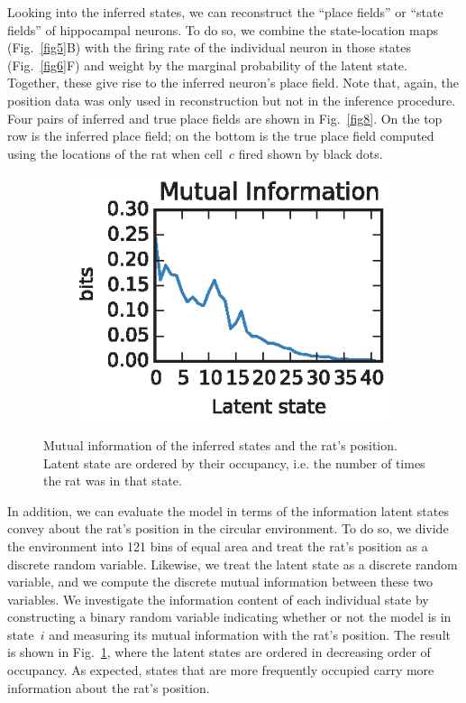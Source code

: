 Looking into the inferred states, we can reconstruct the ``place
fields'' or ``state fields'' of hippocampal neurons. To do so, we
combine the state-location maps (Fig.~\ref{fig5}B) with the firing
rate of the individual neuron in those states (Fig.~\ref{fig6}F) and
weight by the marginal probability of the latent state. Together,
these give rise to the inferred neuron's place field. Note that,
again, the position data was only used in reconstruction but not in
the inference procedure. Four pairs of inferred and true place fields
are shown in Fig.~\ref{fig8}. On the top row is the inferred place
field; on the bottom is the true place field computed using the
locations of the rat when cell~$c$ fired shown by black dots.

\begin{figure}
  \centering
  \begin{subfigure}[t]{2.4in}
    \includegraphics[width=\textwidth]{figures/ch5/Fig9}
  \end{subfigure}
  \caption[Mutual information of inferred states and rat's
    position]{Mutual information of the inferred states and the rat's
    position. Latent state are ordered by their occupancy, i.e. the
    number of times the rat was in that state.  }
  \label{fig9}
\end{figure}

In addition, we can evaluate the model in terms of the information
latent states convey about the rat's position in the circular
environment. To do so, we divide the environment into 121 bins of
equal area and treat the rat's position as a discrete random
variable. Likewise, we treat the latent state as a discrete random
variable, and we compute the discrete mutual information between these
two variables.  We investigate the information content of each
individual state by constructing a binary random variable indicating
whether or not the model is in state~$i$ and measuring its mutual
information with the rat's position. The result is shown in
Fig.~\ref{fig9}, where the latent states are ordered in decreasing
order of occupancy. As expected, states that are more frequently
occupied carry more information about the rat's position.




